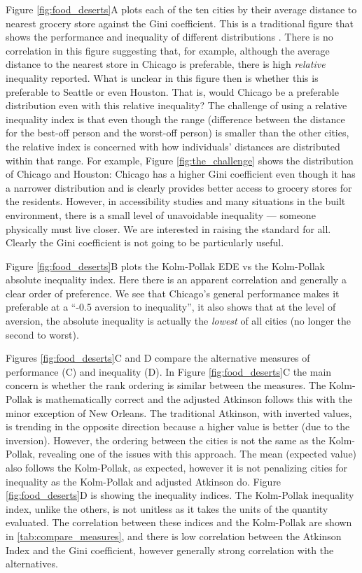 \documentclass[final,3p,times,onecolumn,sort&compress]{elsarticle}
\begin{document}
Figure \ref{fig:food_deserts}A plots each of the ten cities by their average distance to nearest grocery store against the Gini coefficient.
This is a traditional figure that shows the performance and inequality of different distributions \citep{Adger1997-tu}.
There is no correlation in this figure suggesting that, for example, although the average distance to the nearest store in Chicago is preferable, there is high \textit{relative} inequality reported.
What is unclear in this figure then is whether this is preferable to Seattle or even Houston. 
That is, would Chicago be a preferable distribution even with this relative inequality?
The challenge of using a relative inequality index is that even though the range (difference between the distance for the best-off person and the worst-off person) is smaller than the other cities, the relative index is concerned with how individuals' distances are distributed within that range.
For example, Figure \ref{fig:the_challenge} shows the distribution of Chicago and Houston: Chicago has a higher Gini coefficient even though it has a narrower distribution and is clearly provides better access to grocery stores for the residents.
However, in accessibility studies and many situations in the built environment, there is a small level of unavoidable inequality --- someone physically must live closer.
We are interested in raising the standard for all.
Clearly the Gini coefficient is not going to be particularly useful.

Figure \ref{fig:food_deserts}B plots the Kolm-Pollak EDE vs the Kolm-Pollak absolute inequality index. 
Here there is an apparent correlation and generally a clear order of preference.
We see that Chicago's general performance makes it preferable at a ``-0.5 aversion to inequality'', it also shows that at the level of aversion, the absolute inequality is actually the \textit{lowest} of all cities (no longer the second to worst). 

Figures \ref{fig:food_deserts}C and D compare the alternative measures of performance (C) and inequality (D).
In Figure \ref{fig:food_deserts}C the main concern is whether the rank ordering is similar between the measures.
The Kolm-Pollak is mathematically correct and the adjusted Atkinson follows this with the minor exception of New Orleans.
The traditional Atkinson, with inverted values, is trending in the opposite direction because a higher value is better (due to the inversion).
However, the ordering between the cities is not the same as the Kolm-Pollak, revealing one of the issues with this approach.
The mean (expected value) also follows the Kolm-Pollak, as expected, however it is not penalizing cities for inequality as the Kolm-Pollak and adjusted Atkinson do.
Figure \ref{fig:food_deserts}D is showing the inequality indices.
The Kolm-Pollak inequality index, unlike the others, is not unitless as it takes the units of the quantity evaluated.
The correlation between these indices and the Kolm-Pollak are shown in \ref{tab:compare_measures}, and there is low correlation between the Atkinson Index and the Gini coefficient, however generally strong correlation with the alternatives.
\end{document}
